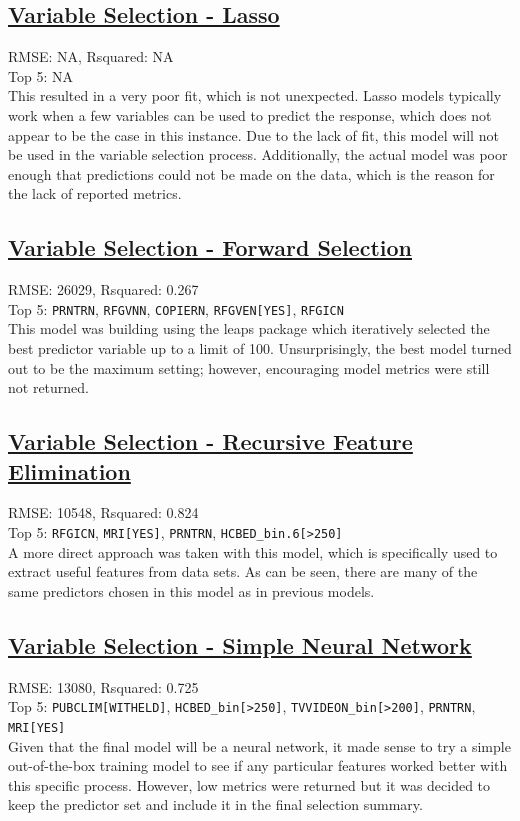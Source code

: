 \subsection{\hyperref[appendix:electricity:l]{Variable Selection - Lasso}}
RMSE: NA, Rsquared: NA\\
 Top 5: NA
\\[0.1in]
\indent This resulted in a very poor fit, which is not unexpected.  Lasso models typically work when a few variables can be used to predict the response, which does not appear to be the case in this instance.  Due to the lack of fit, this model will not be used in the variable selection process.  Additionally, the actual model was poor enough that predictions could not be made on the data, which is the reason for the lack of reported metrics.

\subsection{\hyperref[appendix:electricity:lp]{Variable Selection - Forward Selection}}
RMSE: 26029, Rsquared: 0.267\\
Top 5: \lstinline{PRNTRN}, \lstinline{RFGVNN}, \lstinline{COPIERN}, \lstinline{RFGVEN[YES]}, \lstinline{RFGICN}
\\[0.1in]
\indent This model was building using the leaps package which iteratively selected the best predictor variable up to a limit of 100.  Unsurprisingly, the best model turned out to be the maximum setting; however, encouraging model metrics were still not returned.

\subsection{\hyperref[appendix:electricity:rfe]{Variable Selection - Recursive Feature Elimination}}
RMSE: 10548, Rsquared: 0.824\\
Top 5: \lstinline{RFGICN}, \lstinline{MRI[YES]}, \lstinline{PRNTRN}, \lstinline{HCBED_bin.6[>250]}
\\[0.1in]
\indent A more direct approach was taken with this model, which is specifically used to extract useful features from data sets.  As can be seen, there are many of the same predictors chosen in this model as in previous models.

\subsection{\hyperref[appendix:electricity:snn]{Variable Selection - Simple Neural Network}}
RMSE: 13080, Rsquared: 0.725\\
Top 5: \lstinline{PUBCLIM[WITHELD]}, \lstinline{HCBED_bin[>250]}, \lstinline{TVVIDEON_bin[>200]}, \lstinline{PRNTRN}, \lstinline{MRI[YES]}
\\[0.1in]
\indent Given that the final model will be a neural network, it made sense to try a simple out-of-the-box training model to see if any particular features worked better with this specific process.  However, low metrics were returned but it was decided to keep the predictor set and include it in the final selection summary.
\newpage
